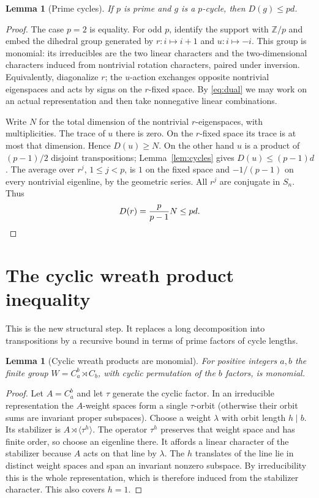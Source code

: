 \documentclass[11pt]{article}
\newtheorem{lemma}[theorem]{Lemma}
\theoremstyle{remark}
\newcommand{\Z}{\mathbb Z}
\begin{document}
\begin{lemma}[Prime cycles]\label{lem:prime}
If $p$ is prime and $g$ is a $p$-cycle, then $D(g)\le p d$.
\end{lemma}
\begin{proof}
The case $p=2$ is equality. For odd $p$, identify the support with $\Z/p$ and embed the dihedral group generated by $r:i\mapsto i+1$ and $u:i\mapsto-i$. This group is monomial: its irreducibles are the two linear characters and the two-dimensional characters induced from nontrivial rotation characters, paired under inversion. Equivalently, diagonalize $r$; the $u$-action exchanges opposite nontrivial eigenspaces and acts by signs on the $r$-fixed space. By \eqref{eq:dual} we may work on an actual representation and then take nonnegative linear combinations.

Write $N$ for the total dimension of the nontrivial $r$-eigenspaces, with multiplicities. The trace of $u$ there is zero. On the $r$-fixed space its trace is at most that dimension. Hence $D(u)\ge N$. On the other hand $u$ is a product of $(p-1)/2$ disjoint transpositions; Lemma~\ref{lem:cycles} gives $D(u)\le(p-1)d$. The average over $r^j$, $1\le j<p$, is $1$ on the fixed space and $-1/(p-1)$ on every nontrivial eigenline, by the geometric series. All $r^j$ are conjugate in $S_n$. Thus
\[ D(r)=\frac p{p-1}N\le p d. \qedhere\]
\end{proof}

\section{The cyclic wreath product inequality}
This is the new structural step. It replaces a long decomposition into transpositions by a recursive bound in terms of prime factors of cycle lengths.
\begin{lemma}[Cyclic wreath products are monomial]\label{lem:mono}
For positive integers $a,b$ the finite group $W=C_a^b\rtimes C_b$, with cyclic permutation of the $b$ factors, is monomial.
\end{lemma}
\begin{proof}
Let $A=C_a^b$ and let $\tau$ generate the cyclic factor. In an irreducible representation the $A$-weight spaces form a single $\tau$-orbit (otherwise their orbit sums are invariant proper subspaces). Choose a weight $\lambda$ with orbit length $h\mid b$. Its stabilizer is $A\rtimes\langle\tau^h\rangle$. The operator $\tau^h$ preserves that weight space and has finite order, so choose an eigenline there. It affords a linear character of the stabilizer because $A$ acts on that line by $\lambda$. The $h$ translates of the line lie in distinct weight spaces and span an invariant nonzero subspace. By irreducibility this is the whole representation, which is therefore induced from the stabilizer character. This also covers $h=1$.
\end{proof}
\end{document}
